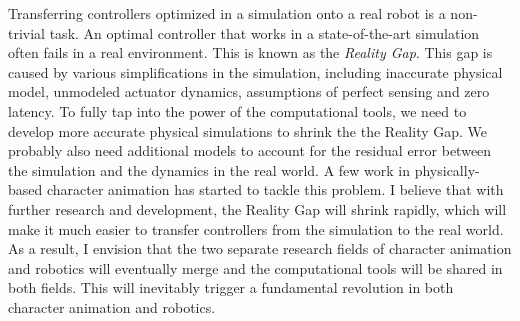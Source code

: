 Transferring controllers optimized in a simulation onto a real robot is a non-trivial task. An optimal controller that works in a state-of-the-art simulation often fails in a real environment. This is known as the \emph{Reality Gap}. This gap is caused by various simplifications in the simulation, including inaccurate physical model, unmodeled actuator dynamics, assumptions of perfect sensing and zero latency. To fully tap into the power of the computational tools, we need to develop more accurate physical simulations to shrink the the Reality Gap. We probably also need additional models to account for the residual error between the simulation and the dynamics in the real world. A few work \cite{} in physically-based character animation has started to tackle this problem. I believe that with further research and development,  the Reality Gap will shrink rapidly, which will make it much easier to transfer controllers from the simulation to the real world. As a result, I envision that the two separate research fields of character animation and robotics will eventually merge and the computational tools will be shared in both fields. This will inevitably trigger a fundamental revolution in both character animation and robotics.


